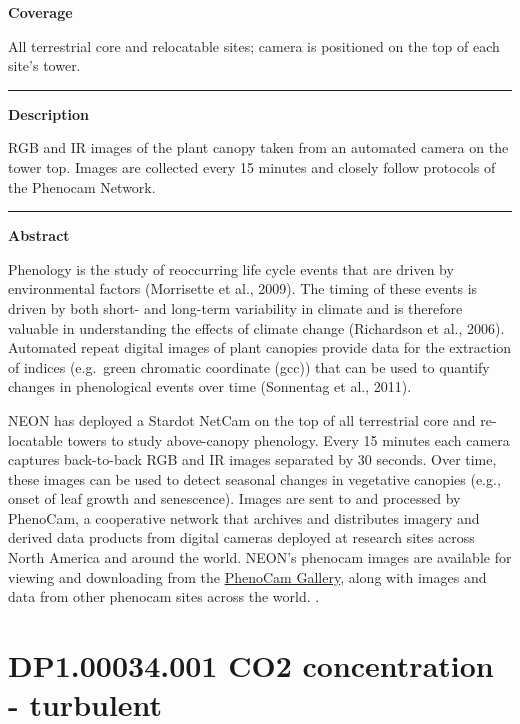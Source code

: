 \documentclass[]{article}
\begin{document}
\textbf{Coverage}

All terrestrial core and relocatable sites; camera is positioned on the
top of each site's tower.

\begin{center}\rule{0.5\linewidth}{\linethickness}\end{center}

\textbf{Description}

RGB and IR images of the plant canopy taken from an automated camera on
the tower top. Images are collected every 15 minutes and closely follow
protocols of the Phenocam Network.

\begin{center}\rule{0.5\linewidth}{\linethickness}\end{center}

\textbf{Abstract}

Phenology is the study of reoccurring life cycle events that are driven
by environmental factors (Morrisette et al., 2009). The timing of these
events is driven by both short- and long-term variability in climate and
is therefore valuable in understanding the effects of climate change
(Richardson et al., 2006). Automated repeat digital images of plant
canopies provide data for the extraction of indices (e.g.~green
chromatic coordinate (gcc)) that can be used to quantify changes in
phenological events over time (Sonnentag et al., 2011).

NEON has deployed a Stardot NetCam on the top of all terrestrial core
and re-locatable towers to study above-canopy phenology. Every 15
minutes each camera captures back-to-back RGB and IR images separated by
30 seconds. Over time, these images can be used to detect seasonal
changes in vegetative canopies (e.g., onset of leaf growth and
senescence). Images are sent to and processed by PhenoCam, a cooperative
network that archives and distributes imagery and derived data products
from digital cameras deployed at research sites across North America and
around the world. NEON's phenocam images are available for viewing and
downloading from the \href{https://phenocam.sr.unh.edu}{PhenoCam
Gallery}, along with images and data from other phenocam sites across
the world. \newpage
.

\section{DP1.00034.001 CO2 concentration -
turbulent}\label{dp1.00034.001-co2-concentration---turbulent}
\end{document}
